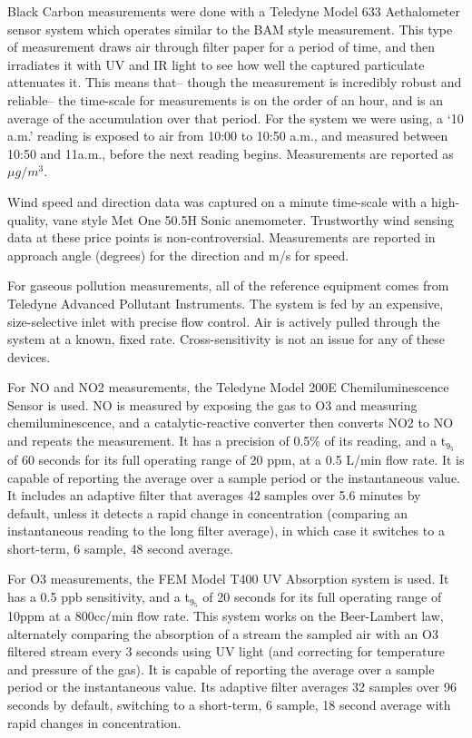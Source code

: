 Black Carbon measurements were done with a Teledyne Model 633 Aethalometer sensor system which operates similar to the BAM style measurement.  This type of measurement draws air through filter paper for a period of time, and then irradiates it with UV and IR light to see how well the captured particulate attenuates it.  This means that-- though the measurement is incredibly robust and reliable-- the time-scale for measurements is on the order of an hour, and is an average of the accumulation over that period.  For the system we were using, a `10 a.m.' reading is exposed to air from 10:00 to 10:50 a.m., and measured between 10:50 and 11a.m., before the next reading begins.  Measurements are reported as \(\mu g/m^3\).
   
Wind speed and direction data was captured on a minute time-scale with a high-quality, vane style Met One 50.5H Sonic anemometer.  Trustworthy wind sensing data at these price points is non-controversial.  Measurements are reported in approach angle (degrees) for the direction and m/s for speed.

For gaseous pollution measurements, all of the reference equipment comes from Teledyne Advanced Pollutant Instruments.  The system is fed by an expensive, size-selective inlet with precise flow control.  Air is actively pulled through the system at a known, fixed rate.   Cross-sensitivity is not an issue for any of these devices.  

For NO and NO2 measurements, the Teledyne Model 200E Chemiluminescence Sensor is used. NO is measured by exposing the gas to O3 and measuring chemiluminescence, and a catalytic-reactive converter then converts NO2 to NO and repeats the measurement.  It has a precision of 0.5\% of its reading, and a t$_9_5$ of 60 seconds for its full operating range of 20 ppm, at a 0.5 L/min flow rate.  It is capable of reporting the average over a sample period or the instantaneous value.  It includes an adaptive filter that averages 42 samples over 5.6 minutes by default, unless it detects a rapid change in concentration (comparing an instantaneous reading to the long filter average), in which case it switches to a short-term, 6 sample, 48 second average.     

For O3 measurements, the FEM Model T400 UV Absorption system is used.  It has a 0.5 ppb sensitivity, and a t$_9_5$ of 20 seconds for its full operating range of 10ppm at a 800cc/min flow rate.  This system works on the Beer-Lambert law, alternately comparing the absorption of a stream the sampled air with an O3 filtered stream every 3 seconds using UV light (and correcting for temperature and pressure of the gas).  It is capable of reporting the average over a sample period or the instantaneous value. Its adaptive filter averages 32 samples over 96 seconds by default, switching to a short-term, 6 sample, 18 second average with rapid changes in concentration.

